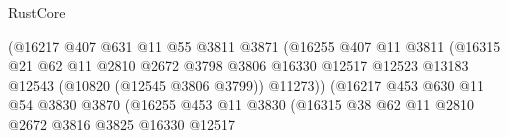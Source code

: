 \begin{lexlean}{RustCore}
\begin{coremodule}
                                            (@16217
                                              @407
                                              @631
                                              @11
                                              @55
                                              @3811
                                              @3871
                                              (@16255
                                                @407
                                                @11
                                                @3811
                                                (@16315
                                                  @21
                                                  @62
                                                  @11
                                                  @2810
                                                  @2672
                                                  @3798
                                                  @3806
                                                  @16330
                                                  @12517
                                                  @12523
                                                  @13183
                                                  @12543
                                                  (@10820 (@12545 @3806 @3799))
                                                  @11273))
                                              (@16217
                                                @453
                                                @630
                                                @11
                                                @54
                                                @3830
                                                @3870
                                                (@16255
                                                  @453
                                                  @11
                                                  @3830
                                                  (@16315
                                                    @38
                                                    @62
                                                    @11
                                                    @2810
                                                    @2672
                                                    @3816
                                                    @3825
                                                    @16330
                                                    @12517

\end{coremodule}
\end{lexlean}
